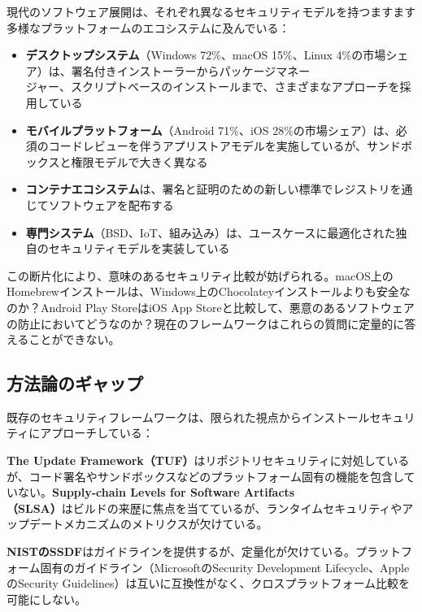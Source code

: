 \documentclass[Specialissue]{jsaiart}
\begin{document}
現代のソフトウェア展開は、それぞれ異なるセキュリティモデルを持つますます多様なプラットフォームのエコシステムに及んでいる\cite{anderson2024linux,liu2024ios,chen2023android}：

\begin{itemize}
    \item \textbf{デスクトップシステム}（Windows 72\%、macOS 15\%、Linux 4\%の市場シェア）は、署名付きインストーラーからパッケージマネー\\ジャー、スクリプトベースのインストールまで、さまざまなアプローチを採用している\cite{microsoft2024windows,apple2023security}
    \item \textbf{モバイルプラットフォーム}（Android 71\%、iOS 28\%の市場シェア）は、必須のコードレビューを伴うアプリストアモデルを実施しているが、サンドボックスと権限モデルで大きく異なる\cite{google2024android}
    \item \textbf{コンテナエコシステム}は、署名と証明のための新しい標準でレジストリを通じてソフトウェアを配布する\cite{kubernetes2024security,docker2024supply}
    \item \textbf{専門システム}（BSD、IoT、組み込み）は、ユースケースに最適化された独自のセキュリティモデルを実装している\cite{kumar2024iot,sadeghi2024embedded}
\end{itemize}

この断片化により、意味のあるセキュリティ比較が妨げられる。macOS上のHomebrewインストールは、Windows上のChocolateyインストールよりも安全なのか？Android Play StoreはiOS App Storeと比較して、悪意のあるソフトウェアの防止においてどうなのか？現在のフレームワークはこれらの質問に定量的に答えることができない。

\subsection{方法論のギャップ}

既存のセキュリティフレームワークは、限られた視点からインストールセキュリティにアプローチしている：

\textbf{The Update Framework（TUF）}\cite{kuppusamy2016tuf}はリポジトリセキュリティに対処しているが、コード署名やサンドボックスなどのプラットフォーム固有の機能を包含していない。\textbf{Supply-chain Levels for Software Artifacts\\（SLSA）}\cite{google2021slsa}はビルドの来歴に焦点を当てているが、ランタイムセキュリティやアップデートメカニズムのメトリクスが欠けている。

\textbf{NISTのSSDF}\cite{nist2024ssdf}はガイドラインを提供するが、定量化が欠けている。プラットフォーム固有のガイドライン（MicrosoftのSecurity Development Lifecycle\cite{microsoft2024windows}、AppleのSecurity Guidelines\cite{apple2023security}）は互いに互換性がなく、クロスプラットフォーム比較を可能にしない。
\end{document}
